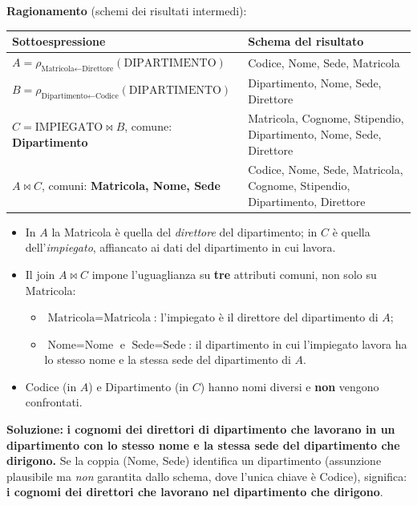 \documentclass[12pt, a4paper]{article}
\begin{document}
\textbf{Ragionamento} (schemi dei risultati intermedi):
\begin{center}
\small
\begin{tabular}{>{\raggedright\arraybackslash}p{7.7cm}>{\raggedright\arraybackslash}p{7.0cm}}
\toprule
\textbf{Sottoespressione} & \textbf{Schema del risultato}\\
\midrule
$A=\rho_{\text{Matricola}\leftarrow\text{Direttore}}(\text{DIPARTIMENTO})$ & Codice, Nome, Sede, Matricola\\
$B=\rho_{\text{Dipartimento}\leftarrow\text{Codice}}(\text{DIPARTIMENTO})$ & Dipartimento, Nome, Sede, Direttore\\
$C=\text{IMPIEGATO}\bowtie B$, comune: \textbf{Dipartimento} & Matricola, Cognome, Stipendio, Dipartimento, Nome, Sede, Direttore\\
$A\bowtie C$, comuni: \textbf{Matricola, Nome, Sede} & Codice, Nome, Sede, Matricola, Cognome, Stipendio, Dipartimento, Direttore\\
\bottomrule
\end{tabular}
\end{center}
\begin{itemize}
\item In $A$ la Matricola è quella del \emph{direttore} del dipartimento; in $C$ è quella dell'\emph{impiegato}, affiancato ai dati del dipartimento in cui lavora.
\item Il join $A\bowtie C$ impone l'uguaglianza su \textbf{tre} attributi comuni, non solo su Matricola:
\begin{itemize}
\item $\text{Matricola}=\text{Matricola}$: l'impiegato è il direttore del dipartimento di $A$;
\item $\text{Nome}=\text{Nome}$ e $\text{Sede}=\text{Sede}$: il dipartimento in cui l'impiegato lavora ha lo stesso nome e la stessa sede del dipartimento di $A$.
\end{itemize}
\item Codice (in $A$) e Dipartimento (in $C$) hanno nomi diversi e \textbf{non} vengono confrontati.
\end{itemize}

\textbf{Soluzione:} \textbf{i cognomi dei direttori di dipartimento che lavorano in un dipartimento con lo stesso nome e la stessa sede del dipartimento che dirigono.} Se la coppia (Nome, Sede) identifica un dipartimento (assunzione plausibile ma \emph{non} garantita dallo schema, dove l'unica chiave è Codice), significa: \textbf{i cognomi dei direttori che lavorano nel dipartimento che dirigono}.
\end{document}
